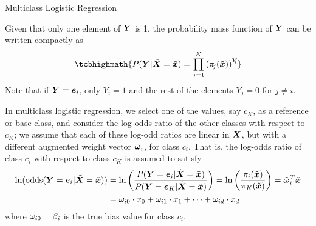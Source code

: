 \begin{frame}{Multiclass Logistic Regression}

Given that only one element of ${\boldsymbol Y}$ is 1, 
the probability mass function of ${\boldsymbol Y}$ can be written compactly as
\begin{align}
    \tcbhighmath{
    P(\bY|\abX=\abx) = \prod_{j=1}^{K} \lB(\pi_{\!j}(\abx)
    \rB)^{Y_{\!\!j}}
}
\end{align}
Note that if ${\boldsymbol Y}={\boldsymbol e}_i$, only $Y_{\!i}=1$ and the rest of the elements
$Y_{\!\!j}=0$ for $j\ne i$.

In multiclass logistic regression, we select one of the values, say
$c_K$, as a reference or base class, and consider the log-odds ratio of
the
other classes with respect to $c_K$; we assume that each of these log-odd
ratios are linear in $\tilde{{\boldsymbol X}}$, but with a different augmented 
weight vector $\tilde{{\bm \omega}}_i$,
for class $c_i$. That is, the log-odds ratio of class $c_i$ with respect to
class $c_K$ is assumed to satisfy
\begin{align*}
    \ln(\operatorname{odds}({\boldsymbol Y}={\boldsymbol e}_i|\tilde{{\boldsymbol X}}=\tilde{{\boldsymbol x}})) & = \ln\left(
    \frac{P({\boldsymbol Y}={\boldsymbol e}_i|\tilde{{\boldsymbol X}}=\tilde{{\boldsymbol x}})}{P({\boldsymbol Y}={\boldsymbol e}_K|\tilde{{\boldsymbol X}}=\tilde{{\boldsymbol x}})} \right) = 
    \ln\left( \frac{\pi_i(\tilde{{\boldsymbol x}})}{\pi_K(\tilde{{\boldsymbol x}})} \right) =
    \tilde{{\bm \omega}}_i^T\tilde{{\boldsymbol x}}\notag\\
    & = \omega_{i0} \cdot x_0 + \omega_{i1} \cdot x_1 + \cdots +
    \omega_{id} \cdot x_d
\end{align*}
where $\omega_{i0} = \beta_i$ is the true bias value for class $c_i$.
%

\end{frame}

